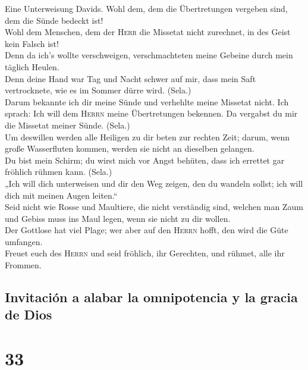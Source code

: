  Eine Unterweisung Davids. Wohl dem, dem die Übertretungen
vergeben sind, dem die Sünde bedeckt ist!\\
 Wohl dem Menschen, dem der \textsc{Herr} die Missetat
nicht zurechnet, in des Geist kein Falsch ist!\\
 Denn da ich's wollte verschweigen, verschmachteten meine
Gebeine durch mein täglich Heulen.\\
 Denn deine Hand war Tag und Nacht schwer auf mir, dass
mein Saft vertrocknete, wie es im Sommer dürre wird. (Sela.)\\
 Darum bekannte ich dir meine Sünde und verhehlte meine
Missetat nicht. Ich sprach: Ich will dem \textsc{Herrn} meine
Übertretungen bekennen. Da vergabst du mir die Missetat meiner Sünde.
(Sela.)\\
 Um deswillen werden alle Heiligen zu dir beten zur
rechten Zeit; darum, wenn große Wasserfluten kommen, werden sie nicht an
dieselben gelangen.\\
 Du bist mein Schirm; du wirst mich vor Angst behüten,
dass ich errettet gar fröhlich rühmen kann. (Sela.)\\
 „Ich will dich unterweisen und dir den Weg zeigen, den du
wandeln sollst; ich will dich mit meinen Augen leiten.``\\
 Seid nicht wie Rosse und Maultiere, die nicht verständig
sind, welchen man Zaum und Gebiss muss ins Maul legen, wenn sie nicht zu
dir wollen.\\
 Der Gottlose hat viel Plage; wer aber auf den
\textsc{Herrn} hofft, den wird die Güte umfangen.\\
 Freuet euch des \textsc{Herrn} und seid fröhlich, ihr
Gerechten, und rühmet, alle ihr Frommen.

\hypertarget{invitaciuxf3n-a-alabar-la-omnipotencia-y-la-gracia-de-dios}{%
\subsection{Invitación a alabar la omnipotencia y la gracia de
Dios}\label{invitaciuxf3n-a-alabar-la-omnipotencia-y-la-gracia-de-dios}}

\hypertarget{section-32}{%
\section{33}\label{section-32}}

